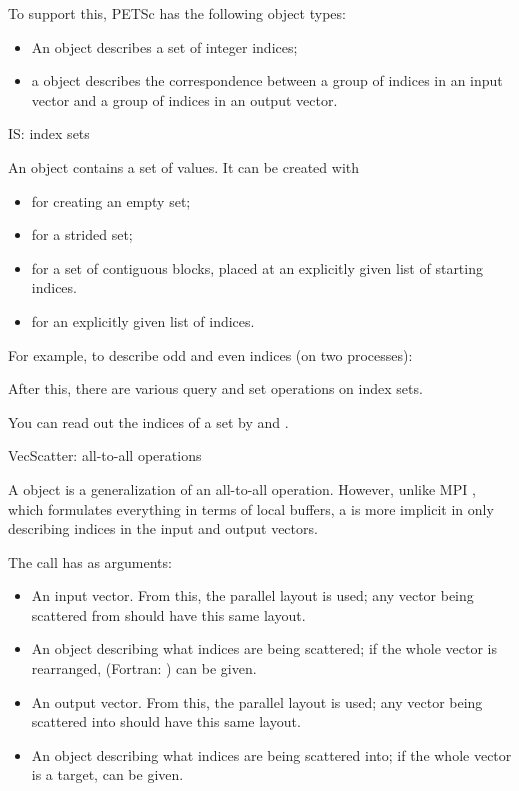 To support this, PETSc has the following object types:
\begin{itemize}
\item An  object describes a set of integer indices;
\item a  object describes the correspondence between
  a group of indices in an input vector and a group of indices in an output vector.
\end{itemize}

 {IS: index sets}
\label{sec:petsc-is}

An  object contains a set of  values.
It can be created with
\begin{itemize}
\item {} for creating an empty set;
\item {} for a strided set;
\item {} for a set of contiguous blocks,
  placed at an explicitly given list of starting indices.
\item {} for an explicitly given list of indices.
\end{itemize}

For example, to describe odd and even indices (on two processes):
%

After this, there are various query and set operations on index sets.

You can read out the indices of a set by 
and .

 {VecScatter: all-to-all operations}
\label{sec:petsc-vs}

A  object is a generalization of an
all-to-all operation. However, unlike MPI ,
which formulates everything in terms of local buffers, a
 is more implicit in only describing indices in
the input and output vectors.

The  call has as arguments:
\begin{itemize}
\item An input vector. From this, the parallel layout is used; any
  vector being scattered from should have this same layout.
\item An  object describing what indices are being
  scattered; if the whole vector is rearranged, 
  (Fortran: ) can be given.
\item An output vector. From this, the parallel layout is used; any
  vector being scattered into should have this same layout.
\item An  object describing what indices are being
  scattered into; if the whole vector is a target,  can
  be given.
\end{itemize}

